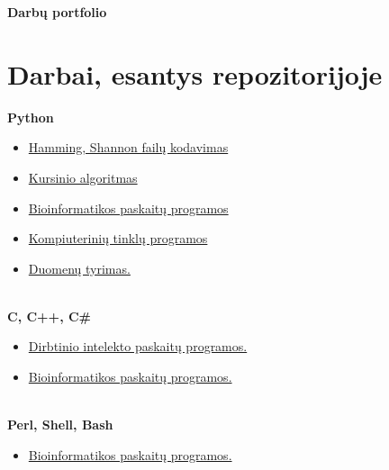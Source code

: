\documentclass[a4paper,12pt]{article}
\begin{document}
\graphicspath{ {/} }

\renewcommand{\cftdot}{.}	
\renewcommand{\cftsecleader}{\cftdotfill{\cftdotsep}}

\thispagestyle{empty} %


\begin{center}
\textbf{Darbų portfolio} \\
\end{center}
\vspace{0.5cm}
\normalsize
\section{Darbai, esantys repozitorijoje}

\textbf{Python}
\begin{itemize}
	\item \href{https://github.com/Luksys5/LT_programos/tree/code}{Hamming, Shannon failų kodavimas}
	\item 
\href{https://github.com/Luksys5/LT_programos/tree/Bakalaurinis}{Kursinio algoritmas}
	\item 
\href{https://github.com/Luksys5/LT_programos/tree/Biotrees}{Bioinformatikos paskaitų programos}
	\item 
\href{https://github.com/Luksys5/LT_programos/tree/tinklai}{Kompiuterinių tinklų programos}
	\item 
\href{https://github.com/Luksys5/LT_programos/tree/Duomenu_Tyrimas}{Duomenų tyrimas.} \\\\
\end{itemize}

\textbf{C, C++, C\#}
\begin{itemize}
	\item 
\href{https://github.com/Luksys5/LT_programos/tree/Dirbtini_Iq}{Dirbtinio intelekto paskaitų programos.}
	\item 
\href{https://github.com/Luksys5/LT_programos/tree/Bioinformatika_4k}{Bioinformatikos paskaitų programos.} \\\\
\end{itemize}

\textbf{Perl, Shell, Bash}
\begin{itemize}
	\item 
\href{https://github.com/Luksys5/LT_programos/tree/GNU-PERL}{Bioinformatikos paskaitų programos.}\\\\ 
\end{itemize} 
\end{document}
